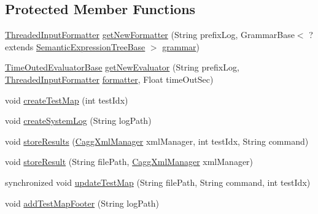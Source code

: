 \subsection*{Protected Member Functions}
\begin{DoxyCompactItemize}
\item 
\hyperlink{classit_1_1emarolab_1_1cagg_1_1core_1_1evaluation_1_1inputFormatting_1_1ThreadedInputFormatter}{Threaded\-Input\-Formatter} \hyperlink{classit_1_1emarolab_1_1cagg_1_1interfaces_1_1CaggGrammarTesterOnFile_ae9428148cf48439d3a530da73fd7350d}{get\-New\-Formatter} (String prefix\-Log, Grammar\-Base$<$ ?extends \hyperlink{interfaceit_1_1emarolab_1_1cagg_1_1core_1_1evaluation_1_1semanticGrammar_1_1syntaxCompiler_1_1SemanticExpressionTreeBase}{Semantic\-Expression\-Tree\-Base} $>$ \hyperlink{classit_1_1emarolab_1_1cagg_1_1core_1_1evaluation_1_1interfacing_1_1GrammarTesterBase_ac6601808f37ef4327e6308143f01dc6a}{grammar})
\item 
\hyperlink{classit_1_1emarolab_1_1cagg_1_1core_1_1evaluation_1_1interfacing_1_1TimeOutedEvaluatorBase}{Time\-Outed\-Evaluator\-Base} \hyperlink{classit_1_1emarolab_1_1cagg_1_1interfaces_1_1CaggGrammarTesterOnFile_a860dba1d7555b36954df5f02858f0ca4}{get\-New\-Evaluator} (String prefix\-Log, \hyperlink{classit_1_1emarolab_1_1cagg_1_1core_1_1evaluation_1_1inputFormatting_1_1ThreadedInputFormatter}{Threaded\-Input\-Formatter} \hyperlink{classit_1_1emarolab_1_1cagg_1_1core_1_1evaluation_1_1interfacing_1_1GrammarTesterBase_a75f3a37db0c23ff1d1f29df7424fe9e4}{formatter}, Float time\-Out\-Sec)
\item 
void \hyperlink{classit_1_1emarolab_1_1cagg_1_1interfaces_1_1CaggGrammarTesterOnFile_ad74ba1f24f583b14b04fd2aa34ed092c}{create\-Test\-Map} (int test\-Idx)
\item 
void \hyperlink{classit_1_1emarolab_1_1cagg_1_1interfaces_1_1CaggGrammarTesterOnFile_a24571605e5adccdb800a15936f1859b6}{create\-System\-Log} (String log\-Path)
\item 
void \hyperlink{classit_1_1emarolab_1_1cagg_1_1interfaces_1_1CaggGrammarTesterOnFile_abab1f4921a683f1c4f5da87b14e5556a}{store\-Results} (\hyperlink{classit_1_1emarolab_1_1cagg_1_1debugging_1_1result2XML_1_1CaggXmlManager}{Cagg\-Xml\-Manager} xml\-Manager, int test\-Idx, String command)
\item 
void \hyperlink{classit_1_1emarolab_1_1cagg_1_1interfaces_1_1CaggGrammarTesterOnFile_a524951d500564a593d4b5f891832b291}{store\-Result} (String file\-Path, \hyperlink{classit_1_1emarolab_1_1cagg_1_1debugging_1_1result2XML_1_1CaggXmlManager}{Cagg\-Xml\-Manager} xml\-Manager)
\item 
synchronized void \hyperlink{classit_1_1emarolab_1_1cagg_1_1interfaces_1_1CaggGrammarTesterOnFile_a4bbad23e944f94affa8c4ddfa652bb11}{update\-Test\-Map} (String file\-Path, String command, int test\-Idx)
\item 
void \hyperlink{classit_1_1emarolab_1_1cagg_1_1interfaces_1_1CaggGrammarTesterOnFile_a30022a56214fa56d8fe370ffa6770c32}{add\-Test\-Map\-Footer} (String log\-Path)
\end{DoxyCompactItemize}
